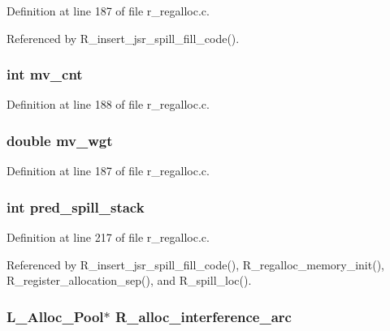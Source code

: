 Definition at line 187 of file r\_\-regalloc.c.

Referenced by R\_\-insert\_\-jsr\_\-spill\_\-fill\_\-code().
\subsubsection{\setlength{\rightskip}{0pt plus 5cm}int \bf{mv\_\-cnt}}\label{r__regalloc_8h_ad328b799284edf18d18c9b67358bf1f}




Definition at line 188 of file r\_\-regalloc.c.
\subsubsection{\setlength{\rightskip}{0pt plus 5cm}double \bf{mv\_\-wgt}}\label{r__regalloc_8h_bfce554b6a8275c861c701bfc72d7b93}




Definition at line 187 of file r\_\-regalloc.c.
\subsubsection{\setlength{\rightskip}{0pt plus 5cm}int \bf{pred\_\-spill\_\-stack}}\label{r__regalloc_8h_f7c2e397f4ba08a61ff6f5e4dd5391df}




Definition at line 217 of file r\_\-regalloc.c.

Referenced by R\_\-insert\_\-jsr\_\-spill\_\-fill\_\-code(), R\_\-regalloc\_\-memory\_\-init(), R\_\-register\_\-allocation\_\-sep(), and R\_\-spill\_\-loc().
\subsubsection{\setlength{\rightskip}{0pt plus 5cm}\bf{L\_\-Alloc\_\-Pool}$\ast$ \bf{R\_\-alloc\_\-interference\_\-arc}}\label{r__regalloc_8h_cbe63b363af67955207c957b29a00b80}




